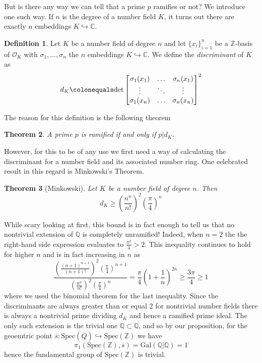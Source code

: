 \documentclass{article}
\newtheorem{theorem}{Theorem}[section]
\theoremstyle{definition}
\newtheorem{definition}[theorem]{Definition}
\theoremstyle{remark}
\theoremstyle{plain}
\newcommand{\C}{\mathbb{C}}
\newcommand{\Z}{\mathbb{Z}}
\newcommand{\Q}{\mathbb{Q}}
\newcommand{\mc}[1]{\mathcal{#1}}
\begin{document}
But is there any way we can tell that a prime $p$ ramifies or not?
We introduce one such way. 
If $n$ is the degree of a number field $K$, it turns out there are exactly $n$ embeddings $K \hookrightarrow \C$.


\begin{definition}
	Let $K$ be a number field of degree $n$ and let $\{x_i\}_{i=1}^n$ be a $\Z$-basis of $\mc{O}_K$ with $\sigma_1, \dots, \sigma_n$ the $n$ embeddings $K \hookrightarrow \C$.
	We define the \textit{discriminant} of $K$ as 
	\[d_K \colonequals \text{det}\begin{bmatrix} 
    \sigma_1(x_1) & \dots  & \sigma_n(x_1)\\
    \vdots & \ddots & \vdots\\
    \sigma_1(x_n) & \dots  & \sigma_n(x_n)
    \end{bmatrix}^2\]
\end{definition}

The reason for this definition is the following theorem

\begin{theorem}
	A prime $p$ is ramified if and only if $p|d_K$.
\end{theorem}

However, for this to be of any use we first need a way of calculating the discriminant for a number field and its associated number ring.
One celebrated result in this regard is Minkowski's Theorem.

\begin{theorem}[Minkowski]
	Let $K$ be a number field of degree $n$.
	Then 
	\[d_K \geq (\frac{n^n}{n!})^2 ( \frac{\pi}{4})^n\]
\end{theorem}

While scary looking at first, this bound is in fact enough to tell us that no nontrivial extension of $\Q$ is completely unramified!
Indeed, when $n = 2$ the the right-hand side expression evaluates to $ \frac{\pi^2}{4} > 2$.
This inequality continues to hold for higher $n$ and is in fact increasing in $n$ as 
\[ \frac{(\frac{(n+1)^{n+1}}{(n+1)!})^2 ( \frac{\pi}{4})^{n+1}}{(\frac{n^n}{n!})^2 ( \frac{\pi}{4})^n} = \frac{\pi}{4}  (1 + \frac{1}{n})^{2n} \geq \frac{3 \pi}{4} \geq 1\]
where we used the binomial theorem for the last inequality.
Since the discriminants are always greater than or equal 2 for nontrivial number fields there is always a nontrivial prime dividing $d_K$ and hence a ramified prime ideal.
The only such extension is the trivial one $\Q \subset \Q$, and so by our proposition, for the geoemtric point $\overline{s}: \text{Spec}( \overline{Q}) \hookrightarrow \text{Spec}(\Z)$ we have 
\[\pi_1(\text{Spec}(\Z), \overline{s}) = \text{Gal}(\Q|\Q) = 1\]
hence the fundamental group of $\text{Spec}(\Z)$ is trivial.
\end{document}
